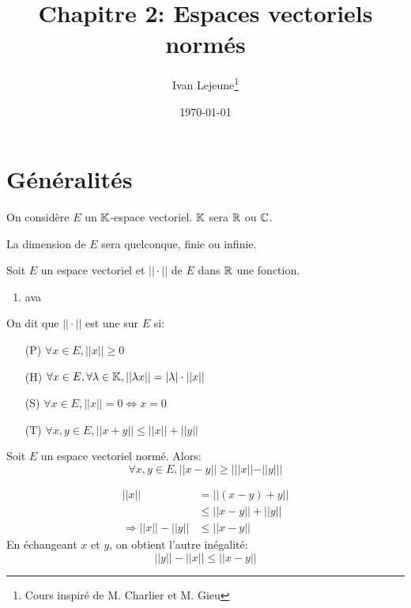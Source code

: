 \documentclass[french,a4paper,10pt]{article}
\title{\color{astral} \sffamily \bfseries Chapitre 2: Espaces vectoriels normés}
\author{Ivan Lejeune\thanks{Cours inspiré de M. Charlier et M. Gieu}}
\date{\today}
\begin{document}
	\maketitle

	\section{Généralités}
    
    On considère $E$ un $\mathbb{K}$-espace vectoriel. $\mathbb{K}$ sera $\mathbb{R}$ ou $\mathbb{C}$.

    La dimension de $E$ sera quelconque, finie ou infinie.

    \begin{definition}
        Soit $E$ un espace vectoriel et $||\cdot ||$ de $E$ dans $\mathbb{R}$ une fonction.

        \begin{enumerate}\item ava \end{enumerate}

        On dit que $||\cdot ||$ est une  sur $E$ si:

        \begin{enumerate}[label=$(\roman*)$]
            \item[(P)] $\forall x \in E, ||x|| \geq 0$
            \item[(H)] $\forall x \in E, \forall \lambda \in \mathbb{K}, ||\lambda x|| = |\lambda| \cdot ||x||$
            \item[(S)] $\forall x\in E, ||x|| = 0 \Leftrightarrow x = 0$
            \item[(T)] $\forall x, y \in E, ||x + y|| \leq ||x|| + ||y||$
        \end{enumerate}
    \end{definition}

    \begin{proposition}[Immédiate] %
        Soit $E$ un espace vectoriel normé. Alors:
        \[
            \forall x, y \in E, ||x - y|| \geq | ||x|| - ||y|| |
        \]
    \end{proposition}

    \begin{myproof}
        \begin{align*}
            ||x|| &= ||(x - y) + y|| \\
            &\leq ||x - y|| + ||y|| \\
            \Rightarrow ||x|| - ||y|| &\leq ||x - y||
        \end{align*}
        En échangeant $x$ et $y$, on obtient l'autre inégalité:
        \[
            ||y|| - ||x|| \leq ||x - y||
        \]
    \end{myproof}
    
\end{document}
